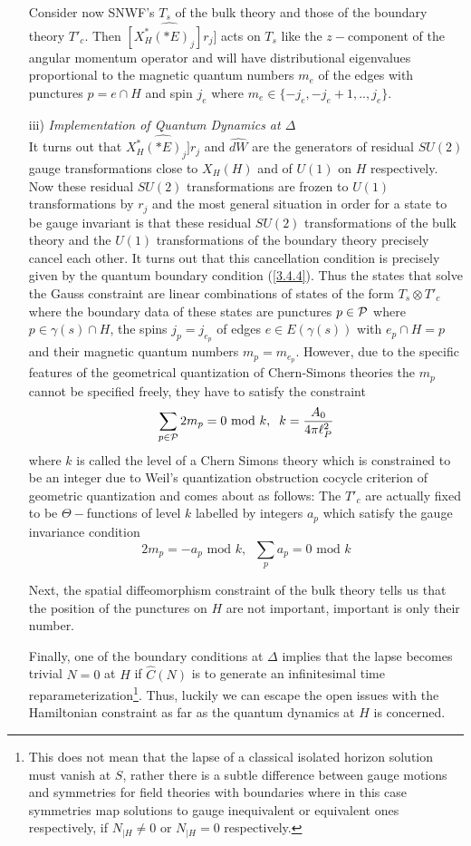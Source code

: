\documentclass[12pt]{report}
\def\be{\begin{equation}}
\def\ee{\end{equation}}
\begin{document}
\begin{itemize}
Consider now SNWF's $T_s$ of the bulk theory and those of the boundary 
theory $T'_c$. Then $\widehat{[X_H^\ast(\ast E)_j]r_j}]$ acts on $T_s$
like the $z-$component of the angular momentum operator and will have 
distributional eigenvalues proportional to the magnetic quantum numbers
$m_e$ of the edges with punctures $p=e\cap H$ and spin $j_e$ where
$m_e\in \{-j_e,-j_e+1,..,j_e\}$.   
%
\item[iii)] {\it Implementation of Quantum Dynamics at $\Delta$}\\
It turns out that    
$\widehat{X_H^\ast(\ast E)_j]r_j}$ and $\widehat{dW}$ are the generators
of residual $SU(2)$ gauge transformations close to $X_H(H)$ and of 
$U(1)$ on $H$ respectively. Now these residual $SU(2)$ transformations 
are frozen to $U(1)$ transformations by $r_j$ and the most general 
situation 
in order for a state to be gauge invariant is that these residual $SU(2)$
transformations of the bulk theory and the $U(1)$ transformations of the 
boundary theory precisely cancel each other. It turns out that this
cancellation condition is precisely given by the quantum boundary 
condition (\ref{3.4.4}). Thus the states that solve the Gauss constraint
are linear combinations of states of the form $T_s\otimes T'_c$ 
where the boundary data of these states are punctures $p\in {\cal P}$ 
where 
$p\in \gamma(s)\cap H$, the spins $j_p=j_{e_p}$ of edges $e\in 
E(\gamma(s))$ with $e_p\cap H=p$ and their magnetic quantum 
numbers $m_p=m_{e_p}$. However, due to the specific features of the 
geometrical
quantization of Chern-Simons theories \cite{61} the $m_p$ cannot be 
specified freely, they have to satisfy the constraint 
\be \label{3.4.5}
\sum_{p\in {\cal P}} 2m_p=0 \mbox{ mod }k,\;\;
k=\frac{A_0}{4\pi \ell_P^2}
\ee
where $k$ is called the level of a Chern Simons theory which is
constrained to be an integer due to Weil's quantization obstruction
cocycle criterion of geometric quantization \cite{26}
and comes about as follows: The $T'_c$ are actually fixed to be 
$\Theta-$functions of level $k$ labelled by integers $a_p$ which satisfy
the gauge invariance condition
\be \label{3.4.6}
2m_p=-a_p \mbox{ mod }k,\;\;\sum_p a_p=0\mbox{ mod }k
\ee

Next, the spatial diffeomorphism constraint
of the bulk theory tells us that the position of the punctures on $H$ 
are not important, important is only their number. 

Finally, one of 
the boundary conditions at $\Delta$ implies that the lapse becomes 
trivial $N=0$ at $H$ if $\hat{C}(N)$ is to generate an infinitesimal 
time reparameterization\footnote{This does not mean that the lapse of a 
classical
isolated horizon solution must vanish at $S$, rather there is a subtle
difference between gauge motions and symmetries for field theories with 
boundaries \cite{60} where in this case symmetries map solutions to gauge 
inequivalent or equivalent ones respectively, if 
$N_{|H}\not=0$ or $N_{|H}=0$ respectively.}. Thus, luckily we can escape 
the open issues with the Hamiltonian constraint as far as the quantum
dynamics at $H$ is concerned. 
%
\end{itemize}
\end{document}
